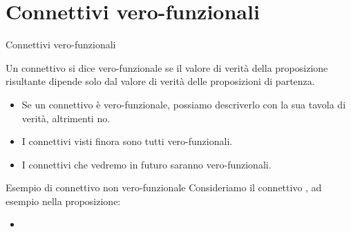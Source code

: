 \documentclass[aspectratio=169,10pt,dvipsnames,handout]{beamer}
\begin{document}
\section{Connettivi vero-funzionali}

\begin{frame}{Connettivi vero-funzionali}
    \begin{definition}
        Un connettivo si dice \alert{vero-funzionale} se il valore di verità della proposizione risultante dipende solo dal valore di verità delle proposizioni di partenza.
    \end{definition}

    \begin{itemize}
        \item Se un connettivo è vero-funzionale, possiamo descriverlo con la sua tavola di verità, altrimenti no.
        \item I connettivi visti finora sono tutti vero-funzionali.
        \item I connettivi che vedremo in futuro saranno vero-funzionali.
    \end{itemize}
\end{frame}

\begin{frame}{Esempio di connettivo non vero-funzionale}
    Consideriamo il connettivo , ad esempio nella proposizione:
    \begin{itemize}
        \item {}
    \end{itemize}

\end{frame}
\end{document}
